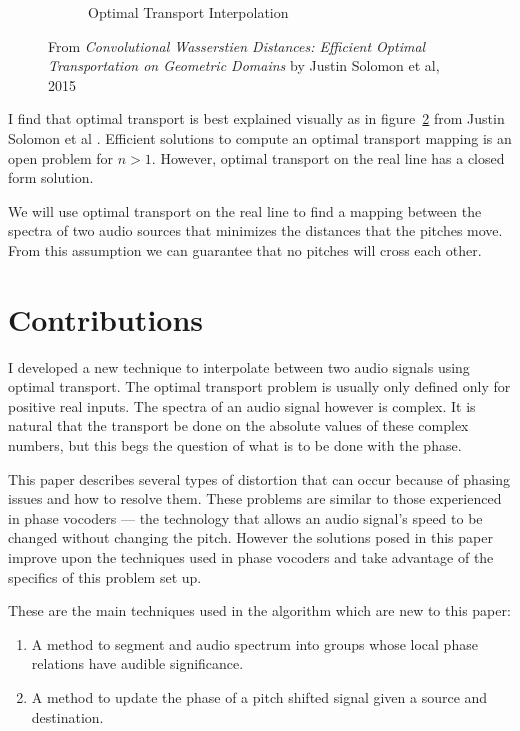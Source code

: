 \documentclass[12pt]{article}
\begin{document}
\begin{figure}
\begin{center}
\begin{subfigure}[b]{0.45\textwidth}
    \caption{Optimal Transport Interpolation}
    \label{fig:wasserstein}
  \end{subfigure}
  \end{center}
  \caption{From \emph{Convolutional Wasserstien Distances: Efficient Optimal Transportation on Geometric Domains} by Justin Solomon et al, 2015\cite{justin}}
  \label{fig:justin}
\end{figure}
I find that optimal transport is best explained visually as in figure~\ref{fig:justin} from Justin Solomon et al \cite{justin}.
Efficient solutions to compute an optimal transport mapping is an open problem 
for $n > 1$.
However, optimal transport on the real line has a closed form solution.

We will use optimal transport on the real line to find a mapping between the spectra of two audio sources that minimizes the distances that the pitches move. 
From this assumption we can guarantee that no pitches will cross each other.

\section{Contributions}

I developed a new technique to interpolate between two audio signals using optimal transport.
The optimal transport problem is usually only defined only for positive real inputs. 
The spectra of an audio signal however is complex.
It is natural that the transport be done on the absolute values of these complex numbers, but this begs the question of what is to be done with the phase.

This paper describes several types of distortion that can occur because of phasing issues and how to resolve them. 
These problems are similar to those experienced in phase vocoders --- the technology that allows an audio signal's speed to be changed without changing the pitch.
However the solutions posed in this paper improve upon the techniques used in phase vocoders and take advantage of the specifics of this problem set up.
\cite{vocoder}

These are the main techniques used in the algorithm which are new to this paper:
\begin{enumerate}
  \item
    A method to segment and audio spectrum into groups whose local phase relations have audible significance.
  \item
    A method to update the phase of a pitch shifted signal given a source and destination.
\end{enumerate}
\end{document}
